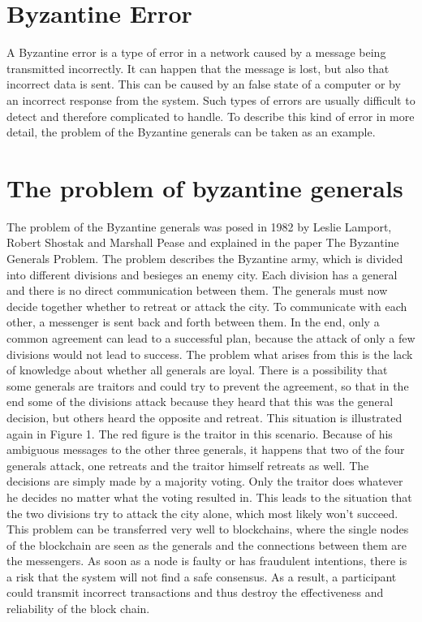 \documentclass[12pt]{article}
\begin{document}
%
%
\section{Byzantine Error}
A Byzantine error is a type of error in a network caused by a message being transmitted incorrectly. It can happen that the message is lost, but also that incorrect data is sent. This can be caused by an false state of a computer or by an incorrect response from the system.\cite{zyzzyva} Such types of errors are usually difficult to detect and therefore complicated to handle.\newline
To describe this kind of error in more detail, the problem of the Byzantine generals can be taken as an example.

\section{The problem of byzantine generals}
The problem of the Byzantine generals was posed in 1982 by Leslie Lamport, Robert Shostak and Marshall Pease and explained in the paper \glqq The Byzantine Generals Problem\grqq \cite{orig paper}.\newline
The problem describes the Byzantine army, which is divided into different divisions and besieges an enemy city. Each division has a general and there is no direct communication between them. The generals must now decide together whether to retreat or attack the city. To communicate with each other, a messenger is sent back and forth between them.
In the end, only a common agreement can lead to a successful plan, because the attack of only a few divisions would not lead to success.
The problem what arises from this is the lack of knowledge about whether all generals are loyal. There is a possibility that some generals are traitors and could try to prevent the agreement, so that in the end some of the divisions attack because they heard that this was the general decision, but others heard the opposite and retreat. This situation is illustrated again in Figure 1. The red figure is the traitor in this scenario. Because of his ambiguous messages to the other three generals, it happens that two of the four generals attack, one retreats and the traitor himself retreats as well. The decisions are simply made by a majority voting. Only the traitor does whatever he decides no matter what the voting resulted in. This leads to the situation that the two divisions try to attack the city alone, which most likely won't succeed.\newline
This problem can be transferred very well to blockchains, where the single nodes of the blockchain are seen as the generals and the connections between them are the messengers. As soon as a node is faulty or has fraudulent intentions, there is a risk that the system will not find a safe consensus. As a result, a participant could transmit incorrect transactions and thus destroy the effectiveness and reliability of the block chain.\cite{blockchainwelt}\newline
\end{document}
